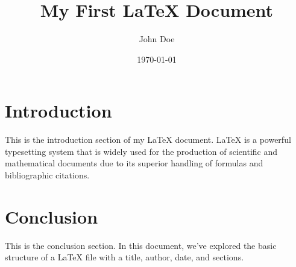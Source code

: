 \documentclass{article}
\title{My First LaTeX Document}
\author{John Doe}
\date{\today}
\begin{document}
\maketitle
\section{Introduction}
This is the introduction section of my LaTeX document. LaTeX is a powerful typesetting system that is widely used for the production of scientific and mathematical documents due to its superior handling of formulas and bibliographic citations.

\section{Conclusion}
This is the conclusion section. In this document, we've explored the basic structure of a LaTeX file with a title, author, date, and sections.
\end{document}
